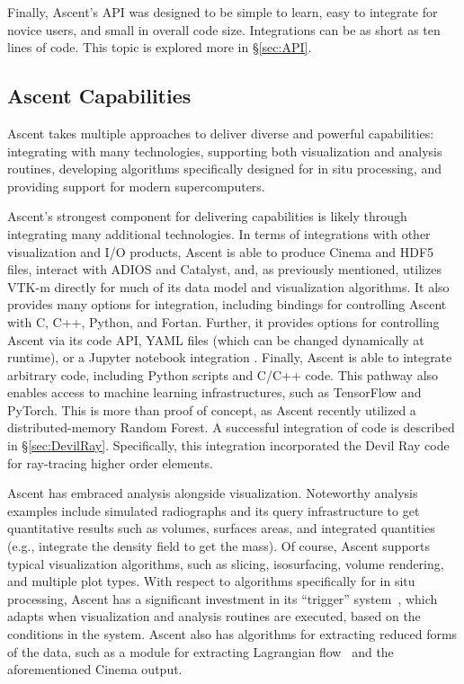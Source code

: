 \documentclass[graybox]{svmult}
\begin{document}
Finally, Ascent's API was designed to be simple to learn,
easy to integrate for novice users, and small in overall code size.
%
Integrations can be as short as ten lines of code.
%
This topic is explored more in \S\ref{sec:API}.

\subsection{Ascent Capabilities}

Ascent takes multiple approaches to deliver diverse and powerful capabilities:
integrating with many technologies,
supporting both visualization and analysis routines,
developing algorithms specifically designed for in situ processing,
and providing support for modern supercomputers.

Ascent's strongest component for delivering capabilities is likely
through integrating many additional technologies.
%
In terms of integrations with other visualization and I/O products,
Ascent is able to produce Cinema and HDF5 files, interact with
ADIOS and Catalyst, and, as previously mentioned, utilizes VTK-m
directly for much of its data model and visualization algorithms.
%
It also provides many options for integration, including
bindings
for controlling Ascent with  C, C++, Python, and Fortan.
%
Further, it provides options for controlling Ascent via its code API,
YAML files (which can be changed dynamically at runtime), or
a Jupyter notebook integration \cite{CyrusISAV}.
%
Finally, Ascent is able to integrate arbitrary code, including
Python scripts and C/C++ code.
%
This pathway also enables access to
machine learning infrastructures, such as TensorFlow and PyTorch.
%
This is more than proof of concept,
as Ascent recently utilized a distributed-memory Random Forest.
%
A successful integration of code is described in \S\ref{sec:DevilRay}.
%
Specifically, this integration incorporated the Devil Ray code for ray-tracing
higher order elements.

Ascent has embraced analysis alongside visualization.
%
Noteworthy analysis examples include simulated radiographs and its
query infrastructure to get quantitative results such as volumes,
surfaces areas, and integrated quantities (e.g., integrate the density field to get the mass).
%
Of course, Ascent supports typical visualization algorithms, such as
slicing, isosurfacing, volume rendering, and multiple plot types.
%
With respect to algorithms specifically for in situ processing, Ascent
has a significant investment in its ``trigger'' system~\cite{Larsen:ISAV18},
which adapts when visualization and analysis routines are executed,
based on the conditions in the system.
%
Ascent also has algorithms for extracting reduced forms of the data,
such as a module for extracting Lagrangian flow~\cite{Agranovsky:LDAV2014,Sane:EGPGV19} and the
aforementioned Cinema output.
\end{document}
